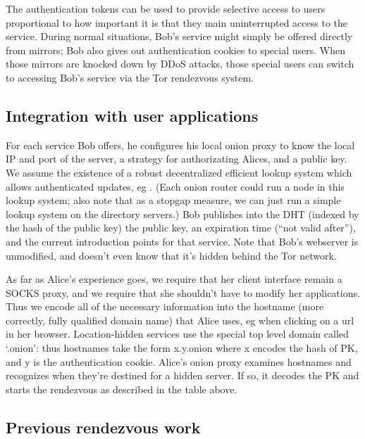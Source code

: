 \documentclass[times,10pt,twocolumn]{article}
\begin{document}
The authentication tokens can be used to provide selective access to users
proportional to how important it is that they main uninterrupted access
to the service. During normal situations, Bob's service might simply be
offered directly from mirrors; Bob also gives out authentication cookies
to special users. When those mirrors are knocked down by DDoS attacks,
those special users can switch to accessing Bob's service via the Tor
rendezvous system.

\subsection{Integration with user applications}

For each service Bob offers, he configures his local onion proxy to know
the local IP and port of the server, a strategy for authorizating Alices,
and a public key. We assume the existence of a robust decentralized
efficient lookup system which allows authenticated updates, eg
\cite{cfs:sosp01}. (Each onion router could run a node in this lookup
system; also note that as a stopgap measure, we can just run a simple
lookup system on the directory servers.)  Bob publishes into the DHT
(indexed by the hash of the public key) the public key, an expiration
time (``not valid after''), and the current introduction points for that
service. Note that Bob's webserver is unmodified, and doesn't even know
that it's hidden behind the Tor network.

As far as Alice's experience goes, we require that her client interface
remain a SOCKS proxy, and we require that she shouldn't have to modify
her applications. Thus we encode all of the necessary information into
the hostname (more correctly, fully qualified domain name) that Alice
uses, eg when clicking on a url in her browser. Location-hidden services
use the special top level domain called `.onion': thus hostnames take the
form x.y.onion where x encodes the hash of PK, and y is the authentication
cookie. Alice's onion proxy examines hostnames and recognizes when they're
destined for a hidden server. If so, it decodes the PK and starts the
rendezvous as described in the table above.

\subsection{Previous rendezvous work}
\end{document}

